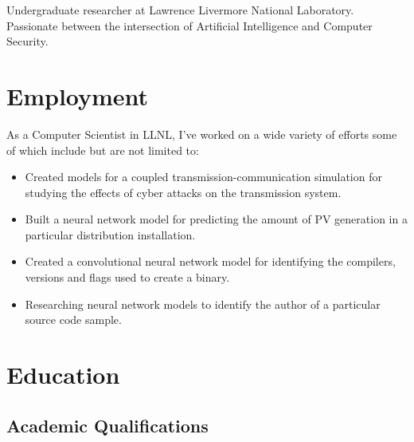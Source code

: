 \documentclass[12pt,a4paper,roman]{moderncv}        %
\begin{document}
\makecvtitle

\small{Undergraduate researcher at Lawrence Livermore National Laboratory. Passionate between the intersection of Artificial Intelligence and Computer Security.}

\section{Employment}

\vspace{5pt}

As a Computer Scientist in LLNL, I've worked on a wide variety of efforts some of which include but are not limited to:
\begin{itemize}
	\item Created models for a coupled transmission-communication simulation for studying the effects of cyber attacks on the transmission system. 
	
  \item Built a neural network model for predicting the amount of PV generation in a particular distribution installation.
	
	\item Created a convolutional neural network model for identifying the compilers, versions and flags used to create a binary.  

	\item Researching neural network models to identify the author of a particular source code sample. 
\end{itemize}

\section{Education}

\subsection{Academic Qualifications}


\vspace{2pt}
\end{document}

